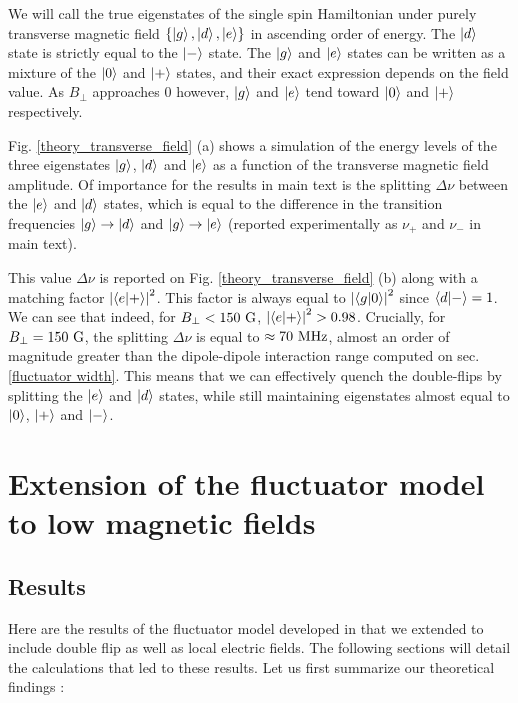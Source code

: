 \documentclass[preprintnumbers,amsmath,amssymb,onecolumn,12pt]{revtex4-2}\usepackage{graphicx}%
\begin{document}
We will call the true eigenstates of the single spin Hamiltonian under purely transverse magnetic field $\{ \ket{g},\ket{d},\ket{e} \}$ in ascending order of energy. The $\ket{d}$ state is strictly equal to the $\ket{-}$ state. The $\ket{g}$ and $\ket{e}$ states can be written as a mixture of the $\ket{0}$ and $\ket{+}$ states, and their exact expression depends on the field value. As $B_{\perp}$ approaches 0 however, $\ket{g}$ and $\ket{e}$ tend toward $\ket{0}$ and $\ket{+}$ respectively.

Fig. \ref{theory_transverse_field} (a) shows a simulation of the energy levels of the three eigenstates $\ket{g}$, $\ket{d}$ and $\ket{e}$ as a function of the transverse magnetic field amplitude. Of importance for the results in main text is the splitting $\Delta \nu$ between the $\ket{e}$ and $\ket{d}$ states, which is equal to the difference in the transition frequencies $\ket{g} \to \ket{d}$ and $\ket{g} \to \ket{e}$ (reported experimentally as $\nu_+$ and $\nu_-$ in main text). 

This value $\Delta \nu$ is reported on Fig. \ref{theory_transverse_field} (b) along with a matching factor $\abs{\bra{e}\ket{+}}^2$. This factor is always equal to $\abs{\bra{g}\ket{0}}^2$ since $\bra{d}\ket{-}=1$. We can see that indeed, for $B_{\perp}<150\ \rm G$, $\abs{\bra{e}\ket{+}}^2>0.98$. Crucially, for $B_{\perp}=150\ \rm G$, the splitting $\Delta \nu$ is equal to $\approx 70\ \rm MHz$, almost an order of magnitude greater than the dipole-dipole interaction range computed on sec. \ref{fluctuator width}. This means that we can effectively quench the double-flips by splitting the $\ket{e}$ and $\ket{d}$ states, while still maintaining eigenstates almost equal to $\ket{0}$, $\ket{+}$ and $\ket{-}$.

\section{Extension of the fluctuator model to low magnetic fields}

\subsection{Results}

Here are the results of the fluctuator model developed in \cite{choi_depolarization_2017} that we extended to include double flip as well as local electric fields. The following sections will detail the calculations that led to these results. Let us first summarize our theoretical findings :
\end{document}
